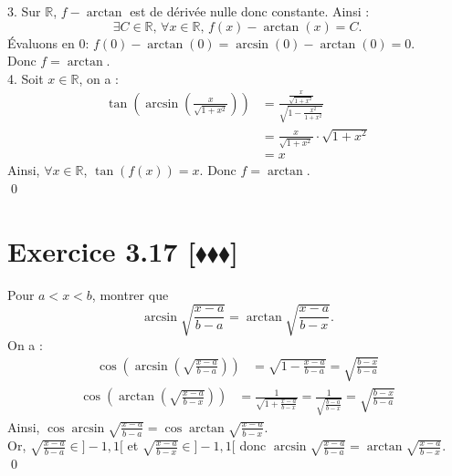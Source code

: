 \documentclass[10pt]{article}
\begin{document}
\begin{tcolorbox}[enhanced, width=6in, center, size=fbox, fontupper=\large, drop shadow southwest]
\begin{equation*}
    \end{equation*}
    3. Sur $\mathbb{R}$, $f-\arctan$ est de dérivée nulle donc constante. Ainsi :
    \begin{equation*}
        \exists C\in\mathbb{R} \text{, } \forall{x}\in\mathbb{R} \text{, } f(x)-\arctan(x)=C.
    \end{equation*}
    Évaluons en $0$: $f(0)-\arctan(0)=\arcsin(0)-\arctan(0)=0$.\\
    Donc $f=\arctan$.\\[0.25cm]
    4. Soit $x\in\mathbb{R}$, on a :
    \begin{align*}
        \tan\left(\arcsin\left(\frac{x}{\sqrt{1+x^2}}\right)\right)&=\frac{\frac{x}{\sqrt{1+x^2}}}{\sqrt{1-\frac{x^2}{1+x^2}}}\\
        &=\frac{x}{\sqrt{1+x^2}}\cdot\sqrt{1+x^2}\\
        &=x
    \end{align*}
    Ainsi, $\forall{x\in\mathbb{R}}$, $\tan(f(x))=x$. Donc $f=\arctan$.\\
    \qed
\end{tcolorbox}


\section*{Exercice 3.17 [$\blacklozenge\blacklozenge\blacklozenge$]}
\begin{tcolorbox}[enhanced, width=6in, center, size=fbox, fontupper=\large, drop shadow southwest]
    Pour $a<x<b$, montrer que 
    \begin{equation*}
        \arcsin\sqrt{\frac{x-a}{b-a}}=\arctan\sqrt{\frac{x-a}{b-x}}.
    \end{equation*}
    On a :
    \begin{align*}
        \cos\left(\arcsin\left(\sqrt{\frac{x-a}{b-a}}\right)\right)&=\sqrt{1-\frac{x-a}{b-a}}=\sqrt{\frac{b-x}{b-a}}
    \end{align*}
    \begin{align*}
        \cos\left(\arctan\left(\sqrt{\frac{x-a}{b-x}}\right)\right)&=\frac{1}{\sqrt{1+\frac{x-a}{b-x}}}=\frac{1}{\sqrt{\frac{b-a}{b-x}}}=\sqrt{\frac{b-x}{b-a}}
    \end{align*}
    Ainsi, $\cos\arcsin\sqrt{\frac{x-a}{b-a}}=\cos\arctan\sqrt{\frac{x-a}{b-x}}$.\\
    Or, $\sqrt{\frac{x-a}{b-a}}\in]-1,1[$ et $\sqrt{\frac{x-a}{b-x}}\in]-1,1[$ donc $\arcsin\sqrt{\frac{x-a}{b-a}}=\arctan\sqrt{\frac{x-a}{b-x}}$.\\
    \qed
\end{tcolorbox}

\end{document}
